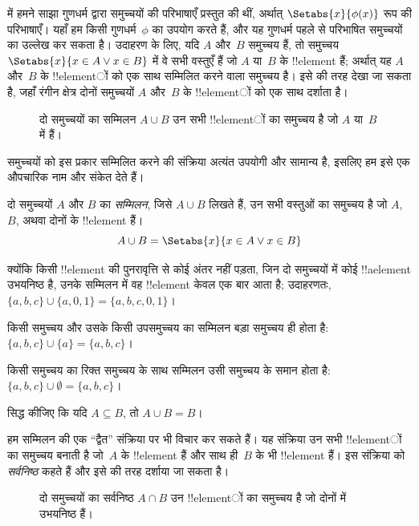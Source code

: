 \documentclass[../../../include/open-logic-section]{subfiles}
\begin{document}

\begin{explain}
 में हमने साझा गुणधर्म द्वारा समुच्चयों की
परिभाषाएँ प्रस्तुत की थीं, अर्थात् $\Setabs{x}{\phi(x)}$ रूप की परिभाषाएँ।
यहाँ हम किसी गुणधर्म~$\phi$ का उपयोग करते हैं, और यह गुणधर्म पहले से
परिभाषित समुच्चयों का उल्लेख कर सकता है। उदाहरण के लिए, यदि $A$ और~$B$
समुच्चय हैं, तो समुच्चय $\Setabs{x}{x \in A \lor x \in B}$ में वे सभी
वस्तुएँ हैं जो $A$ या~$B$ के !!{element} हैं; अर्थात् यह
$A$ और~$B$ के !!{element}ों को एक साथ सम्मिलित करने वाला समुच्चय है। इसे
 की तरह देखा जा सकता है, जहाँ रंगीन क्षेत्र दोनों
समुच्चयों $A$ और~$B$ के !!{element}ों को एक साथ दर्शाता है।

\begin{figure}
  \caption{दो समुच्चयों का सम्मिलन $A \cup B$ उन सभी !!{element}ों का
   समुच्चय है जो $A$ या~$B$ में हैं।}
\end{figure}

समुच्चयों को इस प्रकार सम्मिलित करने की संक्रिया अत्यंत उपयोगी और सामान्य
है, इसलिए हम इसे एक औपचारिक नाम और संकेत देते हैं।
\end{explain}

\begin{defn}[सम्मिलन]
दो समुच्चयों $A$ और $B$ का \emph{सम्मिलन}, जिसे $A \cup B$ लिखते हैं,
उन सभी वस्तुओं का समुच्चय है जो $A$, $B$, अथवा दोनों के !!{element} हैं।
\[
A \cup B = \Setabs{x}{x \in A \lor x \in B}
\]
\end{defn}

\begin{ex}
क्योंकि किसी !!{element} की पुनरावृत्ति से कोई अंतर नहीं पड़ता, जिन दो
समुच्चयों में कोई !!a{element} उभयनिष्ठ है, उनके सम्मिलन में वह !!{element}
केवल एक बार आता है; उदाहरणतः,
$\{ a, b, c\} \cup \{ a, 0, 1\} = \{a, b, c, 0, 1\}$।

किसी समुच्चय और उसके किसी उपसमुच्चय का सम्मिलन बड़ा समुच्चय ही होता है:
$\{a,
b, c \} \cup \{a \} = \{a, b, c\}$।

किसी समुच्चय का रिक्त समुच्चय के साथ सम्मिलन उसी समुच्चय के समान होता है:
$\{a,
b, c \} \cup \emptyset = \{a, b, c \}$।
\end{ex}

\begin{prob}
सिद्ध कीजिए कि यदि $A \subseteq B$, तो $A \cup B = B$।
\end{prob}

\begin{explain}
हम सम्मिलन की एक ``द्वैत'' संक्रिया पर भी विचार कर सकते हैं। यह संक्रिया
उन सभी !!{element}ों का समुच्चय बनाती है जो~$A$ के !!{element} हैं और
साथ ही~$B$ के भी !!{element} हैं। इस संक्रिया को \emph{सर्वनिष्ठ} कहते
हैं और इसे  की तरह दर्शाया जा सकता है।
\begin{figure}
  \caption{दो समुच्चयों का सर्वनिष्ठ $A \cap B$ उन !!{element}ों का
    समुच्चय है जो दोनों में उभयनिष्ठ हैं।}
\end{figure}
\end{explain}
\end{document}
